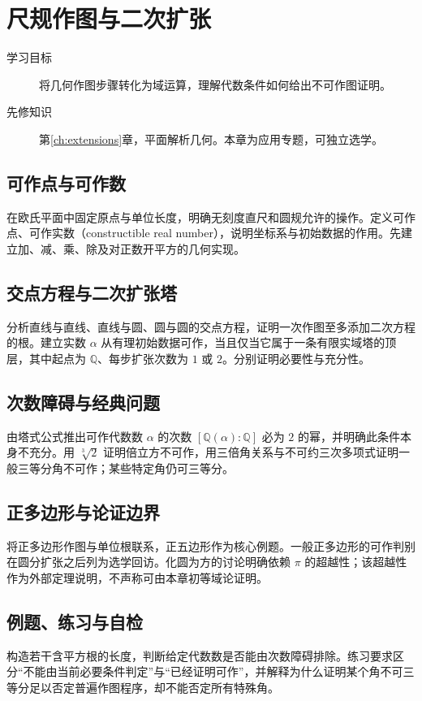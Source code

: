 \setcounter{chapter}{14} %
\chapter{尺规作图与二次扩张}\label{ch:constructions}

\begin{description}
  \item[学习目标] 将几何作图步骤转化为域运算，理解代数条件如何给出不可作图证明。
  \item[先修知识] 第\ref{ch:extensions}章，平面解析几何。本章为应用专题，可独立选学。
\end{description}

\section{可作点与可作数}
在欧氏平面中固定原点与单位长度，明确无刻度直尺和圆规允许的操作。定义可作点、可作实数（constructible real number），说明坐标系与初始数据的作用。先建立加、减、乘、除及对正数开平方的几何实现。

\section{交点方程与二次扩张塔}
分析直线与直线、直线与圆、圆与圆的交点方程，证明一次作图至多添加二次方程的根。建立实数 $\alpha$ 从有理初始数据可作，当且仅当它属于一条有限实域塔的顶层，其中起点为 $\mathbb Q$、每步扩张次数为 $1$ 或 $2$。分别证明必要性与充分性。

\section{次数障碍与经典问题}
由塔式公式推出可作代数数 $\alpha$ 的次数 $[\mathbb Q(\alpha):\mathbb Q]$ 必为 $2$ 的幂，并明确此条件本身不充分。用 $\sqrt[3]{2}$ 证明倍立方不可作，用三倍角关系与不可约三次多项式证明一般三等分角不可作；某些特定角仍可三等分。

\section{正多边形与论证边界}
将正多边形作图与单位根联系，正五边形作为核心例题。一般正多边形的可作判别在圆分扩张之后列为选学回访。化圆为方的讨论明确依赖 $\pi$ 的超越性；该超越性作为外部定理说明，不声称可由本章初等域论证明。

\section{例题、练习与自检}
构造若干含平方根的长度，判断给定代数数是否能由次数障碍排除。练习要求区分“不能由当前必要条件判定”与“已经证明可作”，并解释为什么证明某个角不可三等分足以否定普遍作图程序，却不能否定所有特殊角。

